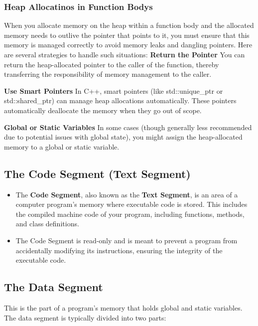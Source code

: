 \documentclass{report}
\begin{document}
\begin{concept}
    \pagebreak 
    \subsubsection{Heap Allocatinos in Function Bodys}
    \bigbreak \noindent 
    When you allocate memory on the heap within a function body and the allocated memory needs to outlive the pointer that points to it, you must ensure that this memory is managed correctly to avoid memory leaks and dangling pointers. Here are several strategies to handle such situations:
    \bigbreak \noindent 
    \textbf{Return the Pointer}
    \bigbreak \noindent 
    You can return the heap-allocated pointer to the caller of the function, thereby transferring the responsibility of memory management to the caller.

    \bigbreak \noindent 
    \textbf{Use Smart Pointers}
    \bigbreak \noindent 
    In C++, smart pointers (like std::unique\_ptr or std::shared\_ptr) can manage heap allocations automatically. These pointers automatically deallocate the memory when they go out of scope.

    \bigbreak \noindent 
    \textbf{Global or Static Variables}
    \bigbreak \noindent 
    In some cases (though generally less recommended due to potential issues with global state), you might assign the heap-allocated memory to a global or static variable.

    \bigbreak \noindent 
    \subsection{The Code Segment (Text Segment)}
    \bigbreak \noindent 
    \begin{itemize}
        \item The \textbf{Code Segment}, also known as the \textbf{Text Segment}, is an area of a computer program's memory where executable code is stored. This includes the compiled machine code of your program, including functions, methods, and class definitions.
        \item The Code Segment is read-only and is meant to prevent a program from accidentally modifying its instructions, ensuring the integrity of the executable code.
    \end{itemize}

    \bigbreak \noindent 
    \subsection{The Data Segment}
    \bigbreak \noindent 
    This is the part of a program's memory that holds global and static variables. The data segment is typically divided into two parts:
    \bigbreak \noindent 

\end{concept}
\end{document}
